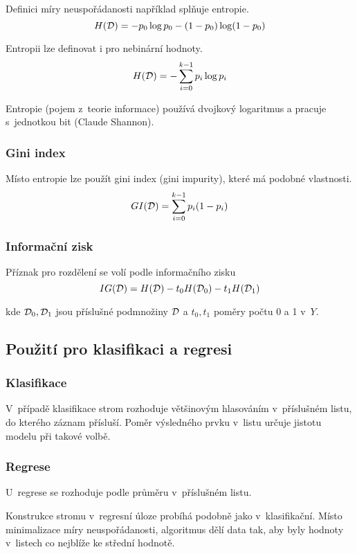 Definici míry neuspořádanosti například splňuje entropie.
\[
    H(\mathcal{D}) = -p_0 \log p_0 - (1-p_0) \log (1-p_0)
\]

Entropii lze definovat i pro nebinární hodnoty.
\[
    H(\mathcal{D}) = - \sum_{i=0}^{k-1} p_i \log p_i
\]

Entropie (pojem z~teorie informace) používá dvojkový logaritmus a pracuje s~jednotkou bit (Claude Shannon).

\subsubsection{Gini index}

Místo entropie lze použít gini index (gini impurity), které má podobné vlastnosti.
\[
    GI(\mathcal{D}) = \sum_{i=0}^{k-1} p_i (1 - p_i)
\]

\subsubsection{Informační zisk}

Příznak pro rozdělení se volí podle informačního zisku
\[
    IG(\mathcal{D}) = H(\mathcal{D}) - t_0 H(\mathcal{D}_0) - t_1 H(\mathcal{D}_1)
\]

kde $\mathcal{D}_0, \mathcal{D}_1$ jsou příslušné podmnožiny $\mathcal{D}$ a $t_0, t_1$ poměry počtu 0 a 1 v~$Y$.

\subsection{Použití pro klasifikaci a regresi}

\subsubsection{Klasifikace}

V~případě klasifikace strom rozhoduje většinovým hlasováním v~příslušném listu, do kterého záznam přísluší. Poměr výsledného prvku v~listu určuje jistotu modelu při takové volbě.

\subsubsection{Regrese}

U~regrese se rozhoduje podle průměru v~příslušném listu.

Konstrukce stromu v~regresní úloze probíhá podobně jako v~klasifikační. Místo minimalizace míry neuspořádanosti, algoritmus dělí data tak, aby byly hodnoty v~listech co nejblíže ke střední hodnotě.

